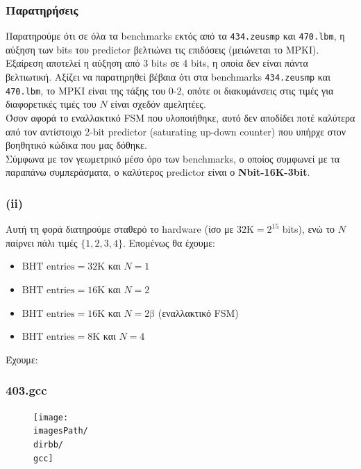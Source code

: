 \documentclass[12pt,a4paper]{article}
\newcommand{\imagesPath}{/home/nick/arch-ntua/ex02/graphs}
\newcommand{\gcc}{403.gcc.cslab_branch_predictors.out.pdf}
\newcommand{\dirbb}{4.2/ii}
\begin{document}
				\subsubsection{Παρατηρήσεις}
					Παρατηρούμε ότι σε όλα τα benchmarks εκτός από τα \verb|434.zeusmp| και \verb|470.lbm|, η αύξηση των bits του predictor βελτιώνει τις επιδόσεις (μειώνεται το MPKI). Εξαίρεση αποτελεί η αύξηση από 3 bits σε 4 bits, η οποία δεν είναι πάντα βελτιωτική. Αξίζει να παρατηρηθεί βέβαια ότι στα benchmarks \verb|434.zeusmp| και \verb|470.lbm|, το MPKI είναι της τάξης του 0-2, οπότε οι διακυμάνσεις στις τιμές για διαφορετικές τιμές του $N$ είναι σχεδόν αμελητέες. \\
					
					Όσον αφορά το εναλλακτικό FSM που υλοποιήθηκε, αυτό δεν αποδίδει ποτέ καλύτερα από τον αντίστοιχο 2-bit predictor (saturating up-down counter) που υπήρχε στον βοηθητικό κώδικα που μας δόθηκε. \\
					
					Σύμφωνα με τον γεωμετρικό μέσο όρο των benchmarks, ο οποίος συμφωνεί με τα παραπάνω συμπεράσματα, ο καλύτερος predictor είναι ο \textbf{Nbit-16K-3bit}.
				
			\subsubsection*{(ii)}
				 Αυτή τη φορά διατηρούμε σταθερό το hardware (ίσο με $32\text{K}=2^{15}$ bits), ενώ το $N$ παίρνει πάλι τιμές $\{1,2,3,4\}$. Επομένως θα έχουμε:
				 
				 \begin{itemize}
				 	\item $\text{BHT entries}=32\text{K}$ και $N=1$
				 	\item $\text{BHT entries}=16\text{K}$ και $N=2$
				 	\item $\text{BHT entries}=16\text{K}$ και $N=2\text{β}$ (εναλλακτικό FSM)
				 	\item $\text{BHT entries}=8\text{K}$ και $Ν=4$
				 \end{itemize}
			 
			 	Έχουμε:
			 	
				\subsubsection{403.gcc}
					\begin{figure}[H]
						\begin{center}
							 \texttt{[image: \\imagesPath/\\dirbb/\\gcc]}
						\end{center}
					\end{figure}
				
\end{document}
